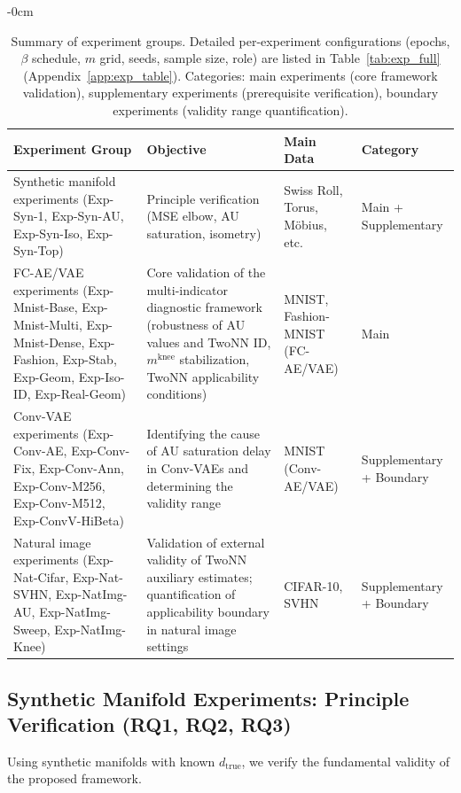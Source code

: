 \documentclass[make,article,submit,pdftex,moreauthors]{Definitions/mdpi}
\newcommand{\dtrue}{d_{\mathrm{true}}}
\newcommand{\mknee}{m^{\mathrm{knee}}}
\begin{document}
\begin{table}[H]
\begin{adjustwidth}{-\extralength}{0cm}
\centering
\caption{Summary of experiment groups. Detailed per-experiment configurations (epochs, $\beta$ schedule, $m$ grid, seeds, sample size, role) are listed in Table~\ref{tab:exp_full} (Appendix~\ref{app:exp_table}). Categories: main experiments (core framework validation), supplementary experiments (prerequisite verification), boundary experiments (validity range quantification).}
\label{tab:exp_list}
\small
\begin{tabular}{p{4.5cm}p{4.0cm}p{3.0cm}p{2.5cm}}
\toprule
Experiment Group & Objective & Main Data & Category \\
\midrule
Synthetic manifold experiments
(Exp-Syn-1, Exp-Syn-AU, Exp-Syn-Iso, Exp-Syn-Top)
  & Principle verification (MSE elbow, AU saturation, isometry)
  & Swiss Roll, Torus, M\"obius, etc.
  & Main + Supplementary \\
\addlinespace
FC-AE/VAE experiments
(Exp-Mnist-Base, Exp-Mnist-Multi, Exp-Mnist-Dense, Exp-Fashion, Exp-Stab, Exp-Geom, Exp-Iso-ID, Exp-Real-Geom)
  & Core validation of the multi-indicator diagnostic framework (robustness of AU values and TwoNN ID, $\mknee$ stabilization, TwoNN applicability conditions)
  & MNIST, Fashion-MNIST (FC-AE/VAE)
  & Main \\
\addlinespace
Conv-VAE experiments
(Exp-Conv-AE, Exp-Conv-Fix, Exp-Conv-Ann, Exp-Conv-M256, Exp-Conv-M512, Exp-ConvV-HiBeta)
  & Identifying the cause of AU saturation delay in Conv-VAEs and determining the validity range
  & MNIST (Conv-AE/VAE)
  & Supplementary + Boundary \\
\addlinespace
Natural image experiments
(Exp-Nat-Cifar, Exp-Nat-SVHN, Exp-NatImg-AU, Exp-NatImg-Sweep, Exp-NatImg-Knee)
  & Validation of external validity of TwoNN auxiliary estimates; quantification of applicability boundary in natural image settings
  & CIFAR-10, SVHN
  & Supplementary + Boundary \\
\bottomrule
\end{tabular}
\end{adjustwidth}
\end{table}

\subsection{Synthetic Manifold Experiments: Principle Verification (RQ1, RQ2, RQ3)}\label{sec:exp_synthetic}

Using synthetic manifolds with known $\dtrue$, we verify the fundamental validity of the proposed framework.
\end{document}
